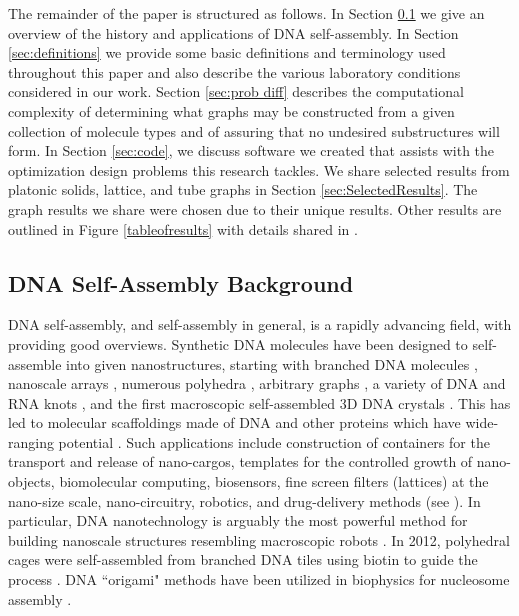\documentclass{elsarticle}
\theoremstyle{definition}
\theoremstyle{remark}
\theoremstyle{plain}
\theoremstyle{plain}
\begin{document}
The remainder of the paper is structured as follows. In Section \ref{sec:background} we give an overview of the history and applications of DNA self-assembly. In Section \ref{sec:definitions} we provide some basic definitions and terminology used throughout this paper and also describe the various laboratory conditions considered in our work. Section \ref{sec:prob diff} describes the computational  complexity  of determining  what  graphs  may  be  constructed  from  a  given  collection of molecule types and of assuring that no undesired substructures will form. 
In Section \ref{sec:code}, we discuss software we created that assists with the optimization design problems this research tackles. We share selected results from platonic solids, lattice, and tube graphs in Section \ref{sec:SelectedResults}. The graph results we share were chosen due to their unique results. Other results are outlined in Figure \ref{tableofresults} with details shared in \cite{repository}. 

\subsection{DNA Self-Assembly Background}\label{sec:background}

DNA self-assembly, and self-assembly in general, is a rapidly advancing field, with \cite{72, 78} providing good overviews. Synthetic DNA molecules have been designed to self-assemble into given nanostructures, starting with branched DNA molecules \cite{59, 89}, nanoscale arrays \cite{91, 92}, numerous polyhedra \cite{benson2015DNA, chen1991synthesis, he2008hierarchical,  49, 84, zhang1994construction}, arbitrary graphs \cite{55, 75, 94}, a variety of DNA and RNA knots \cite{64, 65, 88}, and the first macroscopic self-assembled 3D DNA crystals \cite{99}. This has led to molecular scaffoldings made of DNA and other proteins which have wide-ranging potential \cite{steph2020}. Such applications include construction of containers for the transport and release of nano-cargos, templates for the controlled growth of nano-objects, biomolecular computing, biosensors, fine screen filters (lattices) at the nano-size scale, nano-circuitry, robotics, and drug-delivery methods (see \cite{adleman1994molecular, ellis2019tile, ferrari2018, 41, 43, 61, labean2007constructing, 67, 69, seeman2007overview, wickham2012DNA,  yan2003DNA, 70}). In particular, DNA nanotechnology is arguably the most powerful method for building nanoscale structures resembling macroscopic robots \cite{gerling2015}. In 2012, polyhedral cages were self-assembled from branched DNA tiles using biotin to guide the process \cite{zhang2012}. DNA ``origami" methods have been utilized in biophysics for nucleosome assembly \cite{funke20162, funke2016, le2016}.
  
\end{document}
